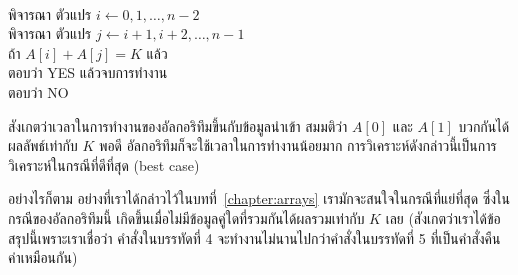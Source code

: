 \begin{algt}
\\
\hspace*{0.2in} พิจารณา ตัวแปร $i\leftarrow 0,1,\ldots,n-2$\\
\hspace*{0.2in}\hspace*{0.2in} พิจารณา ตัวแปร $j\leftarrow i+1,i+2,\ldots,n-1$\\
\hspace*{0.2in}\hspace*{0.2in}\hspace*{0.2in} ถ้า $A[i] + A[j] = K$ แล้ว\\
\hspace*{0.2in}\hspace*{0.2in}\hspace*{0.2in}\hspace*{0.2in} ตอบ{\wbr}ว่า YES แล้ว{\wbr}จบ{\wbr}การ{\wbr}ทำงาน\\
\hspace*{0.2in} ตอบ{\wbr}ว่า NO
\end{algt}

สังเกต{\wbr}ว่า{\wbr}เวลา{\wbr}ใน{\wbr}การ{\wbr}ทำงาน{\wbr}ของ{\wbr}อัล{\wbr}กอ{\wbr}ริ{\wbr}ทึม{\wbr}ขึ้น{\wbr}กับ{\wbr}ข้อมูล{\wbr}นำเข้า สมมติ{\wbr}ว่า $A[0]$ และ $A[1]$
บวก{\wbr}กัน{\wbr}ได้{\wbr}ผลลัพธ์{\wbr}เท่า{\wbr}กับ $K$ พอดี อัล{\wbr}กอ{\wbr}ริ{\wbr}ทึม{\wbr}ก็{\wbr}จะ{\wbr}ใช้เวลา{\wbr}ใน{\wbr}การ{\wbr}ทำงาน{\wbr}น้อย{\wbr}มาก{\wbr}
การ{\wbr}วิเคราะห์{\wbr}ดังกล่าว{\wbr}นี้{\wbr}เป็น{\wbr}การ{\wbr}วิเคราะห์{\wbr}ใน{\wbr}กรณี{\wbr}ที่{\wbr}ดี{\wbr}ที่สุด (best case)

อย่างไรก็ตาม อย่าง{\wbr}ที่{\wbr}เรา{\wbr}ได้{\wbr}กล่าว{\wbr}ไว้{\wbr}ใน{\wbr}บท{\wbr}ที่~\ref{chapter:arrays}
เรา{\wbr}มักจะ{\wbr}สนใจ{\wbr}ใน{\wbr}กรณี{\wbr}ที่{\wbr}แย่{\wbr}ที่สุด ซึ่ง{\wbr}ใน{\wbr}กรณี{\wbr}ของ{\wbr}อัล{\wbr}กอ{\wbr}ริ{\wbr}ทึม{\wbr}นี้{\wbr}
เกิด{\wbr}ขึ้น{\wbr}เมื่อ{\wbr}ไม่{\wbr}มี{\wbr}ข้อมูล{\wbr}คู่{\wbr}ใด{\wbr}ที่{\wbr}รวม{\wbr}กัน{\wbr}ได้{\wbr}ผลรวม{\wbr}เท่า{\wbr}กับ $K$ เลย{\wbr}
(สังเกต{\wbr}ว่า{\wbr}เรา{\wbr}ได้{\wbr}ข้อสรุป{\wbr}นี้{\wbr}เพราะ{\wbr}เรา{\wbr}เชื่อ{\wbr}ว่า คำสั่ง{\wbr}ใน{\wbr}บรรทัด{\wbr}ที่ 4
จะ{\wbr}ทำงาน{\wbr}ไม่{\wbr}นาน{\wbr}ไป{\wbr}กว่า{\wbr}คำสั่ง{\wbr}ใน{\wbr}บรรทัด{\wbr}ที่ 5 ที่{\wbr}เป็น{\wbr}คำสั่ง{\wbr}คืน{\wbr}ค่า{\wbr}เหมือน{\wbr}กัน) 

